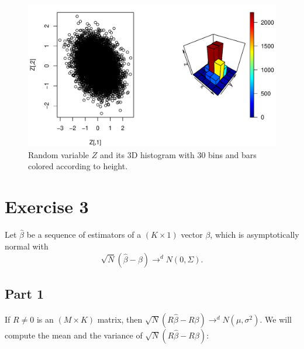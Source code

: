 \documentclass[12pt, a4paper]{article}\usepackage[]{graphicx}\usepackage[]{color}
\makeatletter
\def\maxwidth{ %
  \ifdim\Gin@nat@width>\linewidth
    \linewidth
  \else
    \Gin@nat@width
  \fi
}
\newenvironment{knitrout}{}{} %
\makeatother
\begin{document}
\begin{knitrout}
\color{fgcolor}\begin{figure}[H]

{\centering \includegraphics[width=\maxwidth]{figure/ex2_4histZ-1} 

}

\caption[Random variable $Z$ and its 3D histogram with 30 bins and bars colored according to height]{Random variable $Z$ and its 3D histogram with 30 bins and bars colored according to height.}\label{fig:ex2.4histZ}
\end{figure}


\end{knitrout}












\section{Exercise 3}

Let $\hat{\beta}$ be a sequence of estimators of a $(K\times 1)$ vector $\beta$, which is asymptotically normal with 
\[ \sqrt{N} (\hat{\beta} - \beta) \rightarrow^d N(0,\Sigma) .\]

\subsection{Part 1}

If $R \neq 0$ is an $(M\times K)$ matrix, then $\sqrt{N} (R \hat{\beta} - R\beta) \rightarrow^d N(\mu, \sigma^2)$. We will compute the mean and the variance of $\sqrt{N} (R \hat{\beta} - R \beta)$:
\end{document}
